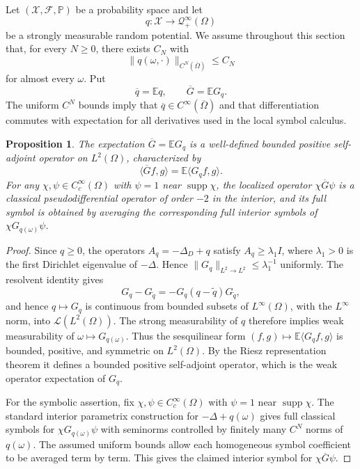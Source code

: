 \documentclass[11pt]{article}
\newcommand{\OmegaD}{\Omega}
\newcommand{\E}{\mathbb E}
\newcommand{\Prob}{\mathbb P}
\newcommand{\supp}{\operatorname{supp}}
\newcommand{\la}{\langle}
\newcommand{\ra}{\rangle}
\theoremstyle{plain}
\newtheorem{proposition}[theorem]{Proposition}
\theoremstyle{definition}
\theoremstyle{remark}
\begin{document}
Let $(\mathcal X,\mathcal F,\Prob)$ be a probability space and let
\[
  q:\mathcal X\to \mathcal Q_+^\infty(\OmegaD)
\]
be a strongly measurable random potential.  We assume throughout this section that, for every $N\ge0$, there exists $C_N$ with
\[
  \|q(\omega,\cdot)\|_{C^N(\overline\OmegaD)}\le C_N
\]
for almost every $\omega$.  Put
\[
  \overline q=\E q,
  \qquad
  \overline G=\E G_q.
\]
The uniform $C^N$ bounds imply that $\overline q\in C^\infty(\overline\OmegaD)$ and that differentiation commutes with expectation for all derivatives used in the local symbol calculus.

\begin{proposition}\label{prop:averaged-G-well-defined}
The expectation $\overline G=\E G_q$ is a well-defined bounded positive self-adjoint operator on $L^2(\OmegaD)$, characterized by
\[
  \la\overline Gf,g\ra=\E\la G_qf,g\ra.
\]
For any $\chi,\psi\in C_c^\infty(\OmegaD)$ with $\psi=1$ near $\supp\chi$, the localized operator $\chi\overline G\psi$ is a classical pseudodifferential operator of order $-2$ in the interior, and its full symbol is obtained by averaging the corresponding full interior symbols of $\chi G_{q(\omega)}\psi$.
\end{proposition}

\begin{proof}
Since $q\ge0$, the operators $A_q=-\Delta_D+q$ satisfy $A_q\ge\lambda_1 I$, where $\lambda_1>0$ is the first Dirichlet eigenvalue of $-\Delta$.  Hence $\|G_q\|_{L^2\to L^2}\le\lambda_1^{-1}$ uniformly.  The resolvent identity gives
\[
  G_q-G_{\widetilde q}=-G_q(q-\widetilde q)G_{\widetilde q},
\]
and hence $q\mapsto G_q$ is continuous from bounded subsets of $L^\infty(\OmegaD)$, with the $L^\infty$ norm, into $\mathcal L(L^2(\OmegaD))$.  The strong measurability of $q$ therefore implies weak measurability of $\omega\mapsto G_{q(\omega)}$.  Thus the sesquilinear form $(f,g)\mapsto\E\la G_qf,g\ra$ is bounded, positive, and symmetric on $L^2(\OmegaD)$.  By the Riesz representation theorem it defines a bounded positive self-adjoint operator, which is the weak operator expectation of $G_q$.

For the symbolic assertion, fix $\chi,\psi\in C_c^\infty(\OmegaD)$ with $\psi=1$ near $\supp\chi$.  The standard interior parametrix construction for $-\Delta+q(\omega)$ gives full classical symbols for $\chi G_{q(\omega)}\psi$ with seminorms controlled by finitely many $C^N$ norms of $q(\omega)$.  The assumed uniform bounds allow each homogeneous symbol coefficient to be averaged term by term.  This gives the claimed interior symbol for $\chi\overline G\psi$.
\end{proof}
\end{document}
